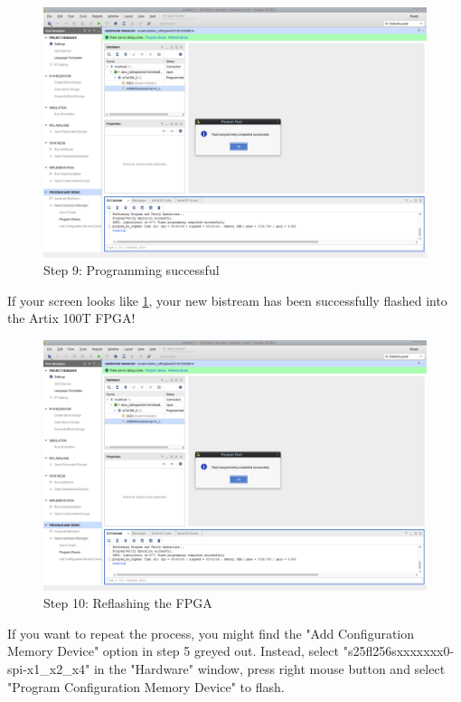 \begin{figure}
  \includegraphics[width=\linewidth]{images/vivado09.png}
  \caption{Step 9: Programming successful}
  \label{fig:vivado09}
\end{figure}

If your screen looks like \ref{fig:vivado09}, your new bistream has been successfully flashed into the Artix 100T FPGA!

\begin{figure}
  \includegraphics[width=\linewidth]{images/vivado09.png}
  \caption{Step 10: Reflashing the FPGA}
  \label{fig:vivado10}
\end{figure}

If you want to repeat the process, you might find the "Add Configuration Memory Device" option in step 5 greyed out. Instead, select "s25fl256sxxxxxxx0-spi-x1\_x2\_x4"  in the "Hardware" window, press right mouse button and select "Program Configuration Memory Device" to flash.

